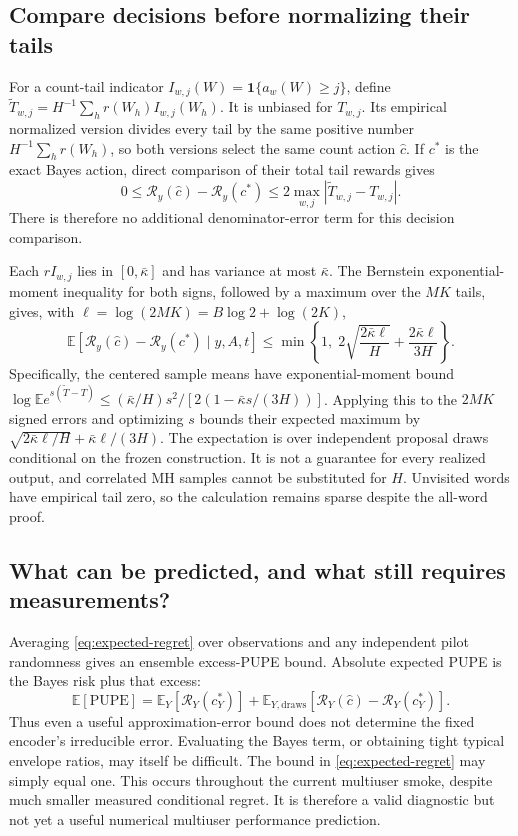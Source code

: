 \documentclass[10pt,a4paper]{article}
\newcommand{\E}{\mathbb E}
\newcommand{\ind}{\mathbf 1}
\newcommand{\risk}{\mathcal R}
\begin{document}
\subsection{Compare decisions before normalizing their tails}
For a count-tail indicator $I_{w,j}(W)=\ind\{a_w(W)\geq j\}$, define
$\widetilde T_{w,j}=H^{-1}\sum_h r(W_h)I_{w,j}(W_h)$.
It is unbiased for $T_{w,j}$. Its empirical normalized version divides every tail by the same
positive number $H^{-1}\sum_h r(W_h)$, so both versions select the same count action $\widehat c$.
If $c^*$ is the exact Bayes action, direct comparison of their total tail rewards gives
\[
 0\leq \risk_y(\widehat c)-\risk_y(c^*)
 \leq 2\max_{w,j}|\widetilde T_{w,j}-T_{w,j}|.
\]
There is therefore no additional denominator-error term for this decision comparison.

Each $rI_{w,j}$ lies in $[0,\bar\kappa]$ and has variance at most $\bar\kappa$.
The Bernstein exponential-moment inequality for both signs, followed by a maximum over the $MK$ tails,
gives, with $\ell=\log(2MK)=B\log2+\log(2K)$,
\begin{equation}
 \boxed{\quad
 \E\!\left[\risk_y(\widehat c)-\risk_y(c^*)\mid y,A,t\right]
 \leq \min\left\{1,\;
 2\sqrt{\frac{2\bar\kappa\ell}{H}}+\frac{2\bar\kappa\ell}{3H}\right\}.
 \quad}
 \label{eq:expected-regret}
\end{equation}
Specifically, the centered sample means have exponential-moment bound
$\log\E e^{s(\widetilde T-T)}
\leq (\bar\kappa/H)s^2/[2(1-\bar\kappa s/(3H))]$.
Applying this to the $2MK$ signed errors and optimizing $s$ bounds their expected maximum by
$\sqrt{2\bar\kappa\ell/H}+\bar\kappa\ell/(3H)$.
The expectation is over independent proposal draws conditional on the frozen construction.
It is not a guarantee for every realized output, and correlated MH samples cannot be substituted for $H$.
Unvisited words have empirical tail zero, so the calculation remains sparse despite the all-word proof.

\subsection{What can be predicted, and what still requires measurements?}
Averaging \eqref{eq:expected-regret} over observations and any independent pilot randomness gives an
ensemble excess-PUPE bound. Absolute expected PUPE is the Bayes risk plus that excess:
\[
 \E[\mathrm{PUPE}]=\E_Y[\risk_Y(c_Y^*)]
                  +\E_{Y,\mathrm{draws}}[\risk_Y(\widehat c)-\risk_Y(c_Y^*)].
\]
Thus even a useful approximation-error bound does not determine the fixed encoder's irreducible error.
Evaluating the Bayes term, or obtaining tight typical envelope ratios, may itself be difficult.
The bound in \eqref{eq:expected-regret} may simply equal one.
This occurs throughout the current multiuser smoke, despite much smaller measured conditional regret.
It is therefore a valid diagnostic but not yet a useful numerical multiuser performance prediction.
\end{document}
